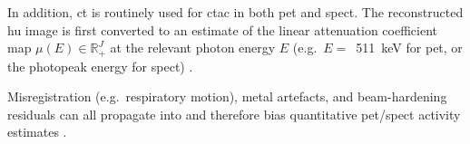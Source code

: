 In addition, \gls{ct} is routinely used for \gls{ctac} in both \gls{pet} and \gls{spect}. The reconstructed \gls{hu} image is first converted to an estimate of the linear attenuation coefficient map $\mu(E)\in\mathbb{R}_+^J$ at the relevant photon energy $E$ (e.g.\ $E=$~\SI{511}{\kilo\electronvolt} for \gls{pet}, or the photopeak energy for \gls{spect}) \cite{schneider_calibration_1996, carney_method_2006}. 

Misregistration (e.g.\ respiratory motion), metal artefacts, and beam-hardening residuals can all propagate into  and therefore bias quantitative \gls{pet}/\gls{spect} activity estimates \cite{singhAttenuationArtifactAttenuation2007, pattonSPECTCTPhysical2008}.
